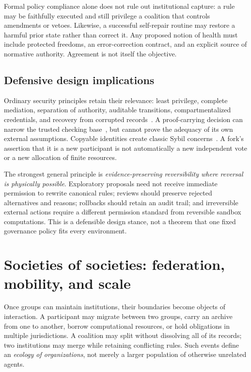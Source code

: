 Formal policy compliance alone does not rule out institutional capture: a rule may be faithfully executed and still privilege a coalition that controls amendments or vetoes. Likewise, a successful self-repair routine may restore a harmful prior state rather than correct it. Any proposed notion of health must include protected freedoms, an error-correction contract, and an explicit source of normative authority. Agreement is not itself the objective.

\subsection{Defensive design implications}

Ordinary security principles retain their relevance: least privilege, complete mediation, separation of authority, auditable transitions, compartmentalized credentials, and recovery from corrupted records~\cite{MS:saltzer}. A proof-carrying decision can narrow the trusted checking base~\cite{MS:necula}, but cannot prove the adequacy of its own external assumptions. Copyable identities create classic Sybil concerns~\cite{MS:douceur}. A fork's assertion that it is a new participant is not automatically a new independent vote or a new allocation of finite resources.

The strongest general principle is \emph{evidence-preserving reversibility where reversal is physically possible}. Exploratory proposals need not receive immediate permission to rewrite canonical rules; reviews should preserve rejected alternatives and reasons; rollbacks should retain an audit trail; and irreversible external actions require a different permission standard from reversible sandbox computations. This is a defensible design stance, not a theorem that one fixed governance policy fits every environment.

\section{Societies of societies: federation, mobility, and scale}\label{MS:sec:ecology}

Once groups can maintain institutions, their boundaries become objects of interaction. A participant may migrate between two groups, carry an archive from one to another, borrow computational resources, or hold obligations in multiple jurisdictions. A coalition may split without dissolving all of its records; two institutions may merge while retaining conflicting rules. Such events define an \emph{ecology of organizations}, not merely a larger population of otherwise unrelated agents.

